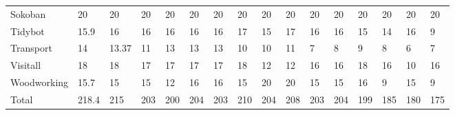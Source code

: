 \begin{table}[htb]
\begin{tabular}{llllllllllllllll}
Sokoban                  & 20                                 & 20              & 20              & 20              & 20              & 20                              & 20                    & 20                   & 20                   & 20                     & 20                     & 20                              & 20                    & 20                      & 20                      \\
Tidybot                  & 15.9                               & 16              & 16              & 16              & 16              & 16                              & 17                    & 15                   & 17                   & 16                     & 16                     & 15                              & 14                    & 16                      & 9                       \\
Transport                & 14                                 & 13.37           & 11              & 13              & 13              & 13                              & 10                    & 10                   & 11                   & 7                      & 8                      & 9                               & 8                     & 6                       & 7                       \\
Visitall                 & 18                                 & 18              & 17              & 17              & 17              & 17                              & 18                    & 12                   & 12                   & 16                     & 16                     & 18                              & 16                    & 10                      & 16                      \\
Woodworking              & 15.7                               & 15              & 15              & 12              & 16              & 16                              & 15                    & 20                   & 20                   & 15                     & 15                     & 16                              & 9                     & 15                      & 9                       \\ \hline
Total                    & 218.4                              & 215             & 203             & 200             & 204             & 203                             & 210                   & 204                  & 208                  & 203                    & 204                    & 199                             & 185                   & 180                     & 175                     \\ \hline
\end{tabular}
\label{tb_two}
\end{table}

